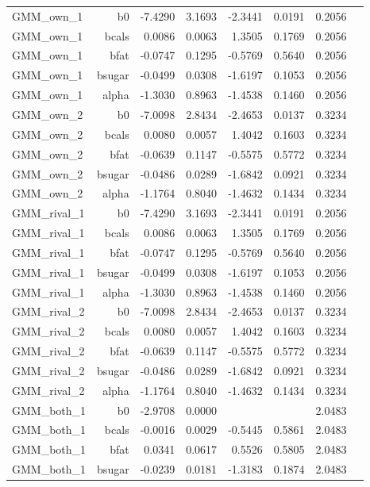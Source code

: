 \begin{longtable}{@{}lrrrrrrr@{}}
GMM\_own\_1 & b0 & -7.4290 & 3.1693 & -2.3441 & 0.0191 & 0.2056 &  \\
GMM\_own\_1 & bcals & 0.0086 & 0.0063 & 1.3505 & 0.1769 & 0.2056 &  \\
GMM\_own\_1 & bfat & -0.0747 & 0.1295 & -0.5769 & 0.5640 & 0.2056 &  \\
GMM\_own\_1 & bsugar & -0.0499 & 0.0308 & -1.6197 & 0.1053 & 0.2056 &  \\
GMM\_own\_1 & alpha & -1.3030 & 0.8963 & -1.4538 & 0.1460 & 0.2056 &  \\
GMM\_own\_2 & b0 & -7.0098 & 2.8434 & -2.4653 & 0.0137 & 0.3234 &  \\
GMM\_own\_2 & bcals & 0.0080 & 0.0057 & 1.4042 & 0.1603 & 0.3234 &  \\
GMM\_own\_2 & bfat & -0.0639 & 0.1147 & -0.5575 & 0.5772 & 0.3234 &  \\
GMM\_own\_2 & bsugar & -0.0486 & 0.0289 & -1.6842 & 0.0921 & 0.3234 &  \\
GMM\_own\_2 & alpha & -1.1764 & 0.8040 & -1.4632 & 0.1434 & 0.3234 &  \\
GMM\_rival\_1 & b0 & -7.4290 & 3.1693 & -2.3441 & 0.0191 & 0.2056 &  \\
GMM\_rival\_1 & bcals & 0.0086 & 0.0063 & 1.3505 & 0.1769 & 0.2056 &  \\
GMM\_rival\_1 & bfat & -0.0747 & 0.1295 & -0.5769 & 0.5640 & 0.2056 &  \\
GMM\_rival\_1 & bsugar & -0.0499 & 0.0308 & -1.6197 & 0.1053 & 0.2056 &  \\
GMM\_rival\_1 & alpha & -1.3030 & 0.8963 & -1.4538 & 0.1460 & 0.2056 &  \\
GMM\_rival\_2 & b0 & -7.0098 & 2.8434 & -2.4653 & 0.0137 & 0.3234 &  \\
GMM\_rival\_2 & bcals & 0.0080 & 0.0057 & 1.4042 & 0.1603 & 0.3234 &  \\
GMM\_rival\_2 & bfat & -0.0639 & 0.1147 & -0.5575 & 0.5772 & 0.3234 &  \\
GMM\_rival\_2 & bsugar & -0.0486 & 0.0289 & -1.6842 & 0.0921 & 0.3234 &  \\
GMM\_rival\_2 & alpha & -1.1764 & 0.8040 & -1.4632 & 0.1434 & 0.3234 &  \\
GMM\_both\_1 & b0 & -2.9708 & 0.0000 &  &  & 2.0483 &  \\
GMM\_both\_1 & bcals & -0.0016 & 0.0029 & -0.5445 & 0.5861 & 2.0483 &  \\
GMM\_both\_1 & bfat & 0.0341 & 0.0617 & 0.5526 & 0.5805 & 2.0483 &  \\
GMM\_both\_1 & bsugar & -0.0239 & 0.0181 & -1.3183 & 0.1874 & 2.0483 &  \\

\end{longtable}
